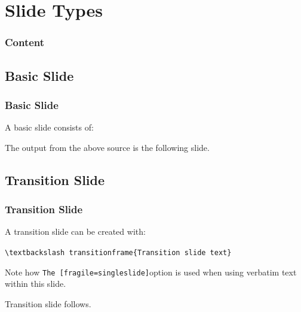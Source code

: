 \documentclass[t]{beamer}
\begin{document}
\section{Slide Types}

\begin{frame}
  \frametitle{Content}
  \tableofcontents[currentsection]
  \vspace{200pt}  %
\end{frame}


\subsection{Basic Slide}
\begin{frame}[fragile=singleslide]  %
  \frametitle{Basic Slide}

  A basic slide consists of:

  

  The output from the above source is the following slide.

\end{frame}



\subsection{Transition Slide}
\begin{frame}[fragile=singleslide]
  \frametitle{Transition Slide}

  A transition slide can be created with:
  \vspace{\baselineskip}

  \verb|\textbackslash transitionframe{Transition slide text}|
  \vspace{\baselineskip}

  Note how \verb|The [fragile=singleslide]|option is used when using verbatim
  text within this slide.
  \vspace{\baselineskip}

  Transition slide follows.

\end{frame}


\end{document}

